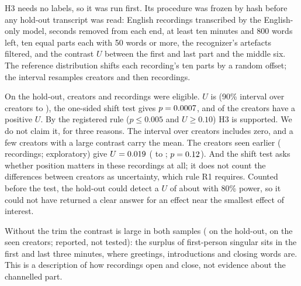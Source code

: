 \documentclass[letterpaper]{article} %
\begin{document}
H3 needs no labels, so it was run first. Its procedure was frozen by hash before any hold-out transcript was read: English recordings transcribed by the English-only model, \HThreeTrimSeconds{} seconds removed from each end, at least ten minutes and 800 words left, ten equal parts each with 50 words or more, the recognizer's artefacts filtered, and the contrast $U$ between the first and last part and the middle six. The reference distribution shifts each recording's ten parts by a random offset; the interval resamples creators and then recordings.

On the hold-out, \HThreeCreators{} creators and \HThreeRecordings{} recordings were eligible. $U$ is \HThreeU{} (90\% interval over creators \HThreeLo{} to \HThreeHi), the one-sided shift test gives $p=0.0007$, and \HThreePositive{} of the \HThreeCreators{} creators have a positive $U$. By the registered rule ($p\leq 0.005$ and $U\geq 0.10$) H3 is supported. We do not claim it, for three reasons. The interval over creators includes zero, and a few creators with a large contrast carry the mean. The \HThreeSeenCreators{} creators seen earlier (\HThreeSeenRecordings{} recordings; exploratory) give $U=0.019$ (\HThreeSeenLo{} to \HThreeSeenHi; $p=0.12$). And the shift test asks whether position matters in these recordings at all; it does not count the differences between creators as uncertainty, which rule R1 requires. Counted before the test, the hold-out could detect a $U$ of about \HThreeDetectable{} with 80\% power, so it could not have returned a clear answer for an effect near the smallest effect of interest.

Without the trim the contrast is large in both samples (\HThreeUntrimmed{} on the hold-out, \HThreeSeenUntrimmed{} on the seen creators; reported, not tested): the surplus of first-person singular sits in the first and last three minutes, where greetings, introductions and closing words are. This is a description of how recordings open and close, not evidence about the channelled part.
\end{document}

